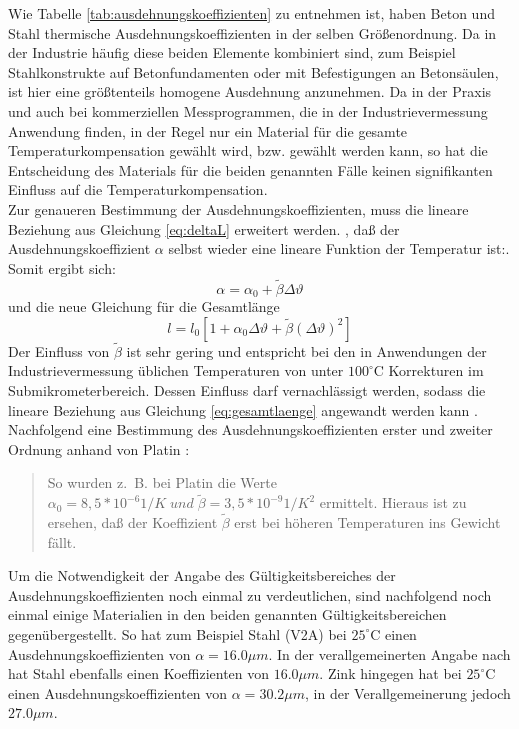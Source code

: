 Wie Tabelle \ref{tab:ausdehnungskoeffizienten} zu entnehmen ist, haben Beton und Stahl thermische Ausdehnungskoeffizienten in der selben Größenordnung. Da in der Industrie häufig diese beiden Elemente kombiniert sind, zum Beispiel Stahlkonstrukte auf Betonfundamenten oder mit Befestigungen an Betonsäulen, ist hier eine größtenteils homogene Ausdehnung anzunehmen. Da in der Praxis und auch bei kommerziellen Messprogrammen, die in der Industrievermessung Anwendung finden, in der Regel nur ein Material für die gesamte Temperaturkompensation gewählt wird, bzw. gewählt werden kann, so hat die Entscheidung des Materials für die beiden genannten Fälle keinen signifikanten Einfluss auf die Temperaturkompensation.\\ 

Zur genaueren Bestimmung der Ausdehnungskoeffizienten, muss die lineare Beziehung aus Gleichung \ref{eq:deltaL} erweitert werden. \glqq[...], daß der Ausdehnungskoeffizient $\alpha$ selbst wieder eine lineare Funktion der Temperatur ist:\grqq \cite{Lindner2006}.\\
Somit ergibt sich:
\begin{equation}
\alpha = \alpha_{0}+\tilde{\beta}\Delta\vartheta
\end{equation}
und die neue Gleichung für die Gesamtlänge
\begin{equation}
l=l_{0}[1+\alpha_{0}\Delta\vartheta+\tilde{\beta}(\Delta\vartheta)^{2}]
\end{equation}
Der Einfluss von $\tilde{\beta}$ ist sehr gering und entspricht bei den in Anwendungen der Industrievermessung üblichen Temperaturen von unter $100^\circ\text{C}$ Korrekturen im Submikrometerbereich. Dessen Einfluss darf vernachlässigt werden, sodass die lineare Beziehung aus Gleichung \ref{eq:gesamtlaenge} angewandt werden kann \cite{Lindner2006}. Nachfolgend eine Bestimmung des Ausdehnungskoeffizienten erster und zweiter Ordnung anhand von Platin \cite{Lindner2006}:
\begin{quotation}
So wurden z.~B. bei Platin die Werte $\alpha_{0}=8,5*10^{-6}1/K \; und \; \tilde{\beta}=3,5*10^{-9}1/K^{2}$ ermittelt. Hieraus ist zu ersehen, daß der Koeffizient $\tilde{\beta}$ erst bei höheren Temperaturen ins Gewicht fällt. \cite{Lindner2006}
\end{quotation}
Um die Notwendigkeit der Angabe des Gültigkeitsbereiches der Ausdehnungskoeffizienten noch einmal zu verdeutlichen, sind nachfolgend noch einmal einige Materialien in den beiden genannten Gültigkeitsbereichen gegenübergestellt. So hat zum Beispiel Stahl (V2A) bei $25^\circ\text{C}$ einen Ausdehnungskoeffizienten von $\alpha = 16.0\mu m$. In der verallgemeinerten Angabe nach \cite{Lindner2006} hat Stahl ebenfalls einen Koeffizienten von $16.0\mu m$. Zink hingegen hat bei $25^\circ\text{C}$ einen Ausdehnungskoeffizienten von $\alpha =  30.2 \mu m$, in der Verallgemeinerung jedoch $27.0 \mu m$. \\
